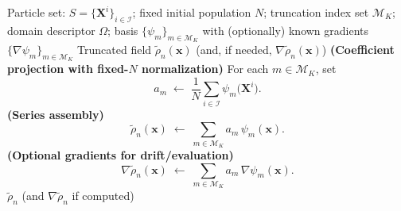 \documentclass[a4paper,fleqn]{cas-sc}
\theoremstyle{definition}
\theoremstyle{remark}
\begin{document}
\begin{algorithm}
\caption{Interpolation Step (fixed-$N$ normalization)}\label{alg:interpolate}
\begin{algorithmic}
\Require Particle set: $S=\{ \mathbf{X}^i \}_{i\in \mathcal{I}}$; fixed initial population $N$; truncation index set $\mathcal{M}_K$; domain descriptor $\Omega$; basis $\{\psi_m\}_{m\in\mathcal{M}_K}$ with (optionally) known gradients $\{\nabla\psi_m\}_{m\in\mathcal{M}_K}$
\Ensure Truncated field $\tilde{\rho}_n(\mathbf{x})$ (and, if needed, $\nabla\tilde{\rho}_n(\mathbf{x})$)
    \State \textbf{(Coefficient projection with fixed-$N$ normalization)}
    \State For each $m\in\mathcal{M}_K$, set
    \[
      a_m \;\gets\; \frac{1}{N}\sum_{i\in\mathcal{I}} \psi_m\!\big(\mathbf{X}^i\big).
    \]
    \State \textbf{(Series assembly)}
    \[
      \tilde{\rho}_n(\mathbf{x}) \;\gets\; \sum_{m\in\mathcal{M}_K} a_m\,\psi_m(\mathbf{x}).
    \]
    \State \textbf{(Optional gradients for drift/evaluation)}
      \[
        \nabla\tilde{\rho}_n(\mathbf{x}) \;\gets\; \sum_{m\in\mathcal{M}_K} a_m\,\nabla\psi_m(\mathbf{x}).
      \]
    \EndIf
    \State \Return $\tilde{\rho}_n$ (and $\nabla\tilde{\rho}_n$ if computed)
\EndProcedure
\end{algorithmic}
\end{algorithm}
\end{document}
